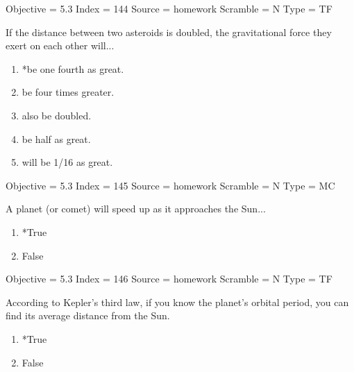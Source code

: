 \documentclass[11pt]{article}
\begin{document}
\begin{enumerate}
\begin{minipage}{\textwidth}
\begin{minipage}{\textwidth}
Objective = 5.3
Index = 144
Source = homework
Scramble = N
Type = TF
\end{minipage}
\end{minipage}
\vskip 0.20in

\begin{minipage}{\textwidth}
\begin{minipage}{\textwidth}
\item If the distance between two asteroids is doubled, the gravitational force they exert on each other will...
\begin{multicols}{2}
\begin{enumerate} 
\setlength{\itemsep}{1pt} 
\setlength{\parskip}{0pt} 
\setlength{\parsep}{0pt}
\setlength{\multicolsep}{1pt} 
\item *be one fourth as great.
\item be four times greater.
\item also be doubled.
\item be half as great.
\item will be 1/16 as great.
\end{enumerate} 
\vfill 
\end{multicols}

Objective = 5.3
Index = 145
Source = homework
Scramble = N
Type = MC
\end{minipage}
\end{minipage}
\vskip 0.20in

\begin{minipage}{\textwidth}
\begin{minipage}{\textwidth}
\item A planet (or comet) will speed up as it approaches the Sun...
\begin{multicols}{3}
\begin{enumerate} 
\setlength{\itemsep}{1pt} 
\setlength{\parskip}{0pt} 
\setlength{\parsep}{0pt}
\setlength{\multicolsep}{1pt} 
\item *True
\item False
\end{enumerate} 
\vfill 
\end{multicols}

Objective = 5.3
Index = 146
Source = homework
Scramble = N
Type = TF
\end{minipage}
\end{minipage}
\vskip 0.20in

\begin{minipage}{\textwidth}
\begin{minipage}{\textwidth}
\item According to Kepler's third law, if you know the planet's orbital period, you can find its average distance from the Sun.
\begin{multicols}{3}
\begin{enumerate} 
\setlength{\itemsep}{1pt} 
\setlength{\parskip}{0pt} 
\setlength{\parsep}{0pt}
\setlength{\multicolsep}{1pt} 
\item *True
\item False
\end{enumerate} 
\vfill 
\end{multicols}


\end{minipage}
\end{minipage}
\end{enumerate}
\end{document}
